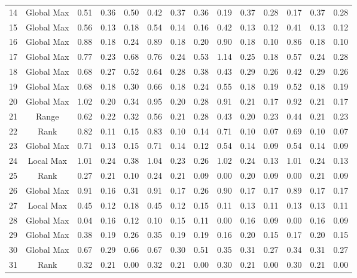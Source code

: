 \documentclass[11pt,a4paper]{article}
\begin{document}
\begin{table}[ht]
{\begin{tabular}{@{\extracolsep{4pt}}cccccccccccccc}
  14 & Global Max & 0.51 & 0.36 & 0.50 & 0.42 & 0.37 & 0.36 & 0.19 & 0.37 & 0.28 & 0.17 & 0.37 & 0.28 \\ 
  15 & Global Max & 0.56 & 0.13 & 0.18 & 0.54 & 0.14 & 0.16 & 0.42 & 0.13 & 0.12 & 0.41 & 0.13 & 0.12 \\ 
  16 & Global Max & 0.88 & 0.18 & 0.24 & 0.89 & 0.18 & 0.20 & 0.90 & 0.18 & 0.10 & 0.86 & 0.18 & 0.10 \\ 
  17 & Global Max & 0.77 & 0.23 & 0.68 & 0.76 & 0.24 & 0.53 & 1.14 & 0.25 & 0.18 & 0.57 & 0.24 & 0.28 \\ 
  18 & Global Max & 0.68 & 0.27 & 0.52 & 0.64 & 0.28 & 0.38 & 0.43 & 0.29 & 0.26 & 0.42 & 0.29 & 0.26 \\ 
  19 & Global Max & 0.68 & 0.18 & 0.30 & 0.66 & 0.18 & 0.24 & 0.55 & 0.18 & 0.19 & 0.52 & 0.18 & 0.19 \\ 
  20 & Global Max & 1.02 & 0.20 & 0.34 & 0.95 & 0.20 & 0.28 & 0.91 & 0.21 & 0.17 & 0.92 & 0.21 & 0.17 \\ 
  21 & Range & 0.62 & 0.22 & 0.32 & 0.56 & 0.21 & 0.28 & 0.43 & 0.20 & 0.23 & 0.44 & 0.21 & 0.23 \\ 
  22 & Rank & 0.82 & 0.11 & 0.15 & 0.83 & 0.10 & 0.14 & 0.71 & 0.10 & 0.07 & 0.69 & 0.10 & 0.07 \\ 
  23 & Global Max & 0.71 & 0.13 & 0.15 & 0.71 & 0.14 & 0.12 & 0.54 & 0.14 & 0.09 & 0.54 & 0.14 & 0.09 \\ 
  24 & Local Max & 1.01 & 0.24 & 0.38 & 1.04 & 0.23 & 0.26 & 1.02 & 0.24 & 0.13 & 1.01 & 0.24 & 0.13 \\ 
  25 & Rank & 0.27 & 0.21 & 0.10 & 0.24 & 0.21 & 0.09 & 0.00 & 0.20 & 0.09 & 0.00 & 0.21 & 0.09 \\ 
  26 & Global Max & 0.91 & 0.16 & 0.31 & 0.91 & 0.17 & 0.26 & 0.90 & 0.17 & 0.17 & 0.89 & 0.17 & 0.17 \\ 
  27 & Local Max & 0.45 & 0.12 & 0.18 & 0.45 & 0.12 & 0.15 & 0.11 & 0.13 & 0.11 & 0.13 & 0.13 & 0.11 \\ 
  28 & Global Max & 0.04 & 0.16 & 0.12 & 0.10 & 0.15 & 0.11 & 0.00 & 0.16 & 0.09 & 0.00 & 0.16 & 0.09 \\ 
  29 & Global Max & 0.38 & 0.19 & 0.26 & 0.35 & 0.19 & 0.19 & 0.16 & 0.20 & 0.15 & 0.17 & 0.20 & 0.15 \\ 
  30 & Global Max & 0.67 & 0.29 & 0.66 & 0.67 & 0.30 & 0.51 & 0.35 & 0.31 & 0.27 & 0.34 & 0.31 & 0.27 \\ 
  31 & Rank & 0.32 & 0.21 & 0.00 & 0.32 & 0.21 & 0.00 & 0.30 & 0.21 & 0.00 & 0.30 & 0.21 & 0.00 \\ 

\end{tabular}}
\end{table}
\end{document}
